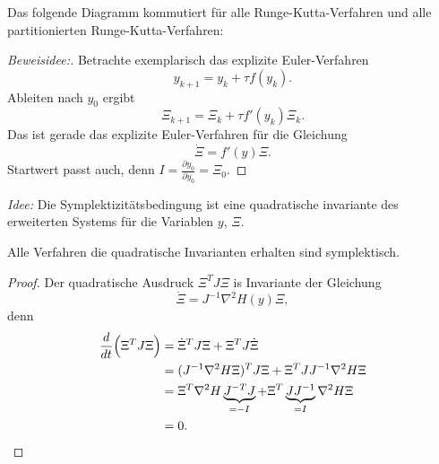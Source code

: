 \begin{lemma}
	
	Das folgende Diagramm kommutiert für alle Runge-Kutta-Verfahren und alle partitionierten Runge-Kutta-Verfahren:\\
	\begin{center}
	\end{center}
\end{lemma}
\begin{proof}[Beweisidee:] Betrachte exemplarisch das explizite Euler-Verfahren
\begin{equation*}
	y_{k+1} = y_k +\tau f(y_k).
\end{equation*}
Ableiten nach $y_0$ ergibt
\begin{equation*}
	\Xi_{k+1} = \Xi_k + \tau f'(y_k)\Xi_k.
\end{equation*}
Das ist gerade das explizite Euler-Verfahren für die Gleichung
\begin{equation*}
	\dot \Xi = f'(y)\Xi.
\end{equation*}
Startwert passt auch, denn $I=\frac{\partial y_0}{\partial y_0} = \Xi_0$.
\end{proof}

\bigskip

\emph{Idee:} Die Symplektizitätsbedingung ist eine quadratische invariante des
erweiterten Systems für die Variablen $y$, $\Xi$.


\begin{satz}
	Alle Verfahren die quadratische Invarianten erhalten sind symplektisch.
\end{satz}
\begin{proof}
	Der quadratische Ausdruck $\Xi^T J\Xi$ is Invariante der Gleichung
	\begin{equation*}
		\dot \Xi = J^{-1}\nabla^2 H(y)\Xi,
	\end{equation*}
	denn
	\begin{align*}
		\frac{d}{dt}\Big(\Xi^T J\Xi\Big) & = \dot \Xi^T J\Xi + \Xi^T J\dot\Xi \\
		                                 & = (J^{-1}\nabla^2 H\Xi)^T J\Xi + \Xi^T JJ^{-1}\nabla^2 H \Xi \\
		                                 & = \Xi^T \nabla^2 H \underbrace{J^{-T}J}_{=-I} + \Xi^T\underbrace{ JJ^{-1}}_{=I} \nabla^2 H \Xi \\
		                                 & = 0.  \qedhere
	\end{align*}
\end{proof}

